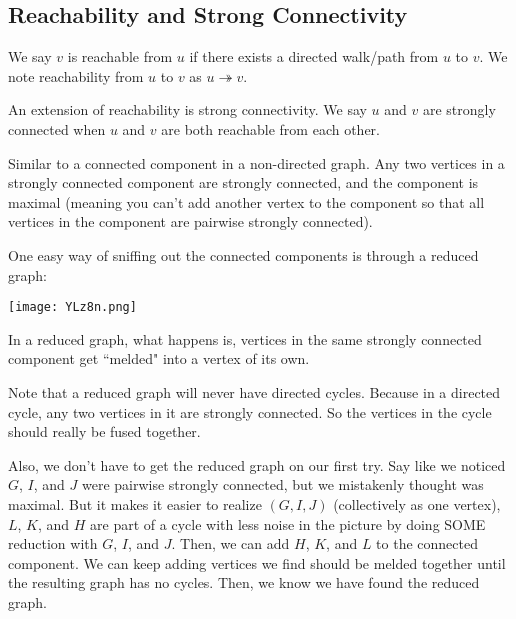 \documentclass[11pt]{scrartcl}
\begin{document}
\subsection{Reachability and Strong Connectivity}

\begin{definition}[Reachability]
We say $v$ is reachable from $u$ if there exists a directed walk/path from $u$ to $v$. We note reachability from $u$ to $v$ as $u \twoheadrightarrow v$.
\end{definition}

\begin{definition}
An extension of reachability is strong connectivity. We say $u$ and $v$ are strongly connected when $u$ and $v$ are both reachable from each other.
\end{definition}

\begin{definition}
Similar to a connected component in a non-directed graph. Any two vertices in a strongly connected component are strongly connected, and the component is maximal (meaning you can't add another vertex to the component so that all vertices in the component are pairwise strongly connected).
\end{definition}

One easy way of sniffing out the connected components is through a reduced graph:

\begin{center}
\texttt{[image: YLz8n.png]}
\end{center}

In a reduced graph, what happens is, vertices in the same strongly connected component get ``melded" into a vertex of its own.

Note that a reduced graph will never have directed cycles. Because in a directed cycle, any two vertices in it are strongly connected. So the vertices in the cycle should really be fused together.

Also, we don't have to get the reduced graph on our first try. Say like we noticed $G$, $I$, and $J$ were pairwise strongly connected, but we mistakenly thought was maximal. But it makes it easier to  realize $(G, I, J)$ (collectively as one vertex), $L$, $K$, and $H$ are part of a cycle with less noise in the picture by doing SOME reduction with $G$, $I$, and $J$. Then, we can add $H$, $K$, and $L$ to the connected component. We can keep adding vertices we find should be melded together until the resulting graph has no cycles. Then, we know we have found the reduced graph.
\end{document}

